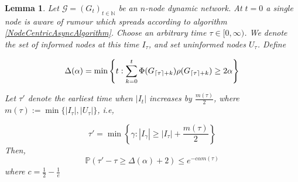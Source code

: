 \documentclass[a4paper,11pt]{article}
\newtheorem{lemma}[theorem]{Lemma}
\theoremstyle{definition}
\DeclarePairedDelimiter\ceil{\lceil}{\rceil}
\begin{document}
\begin{lemma} \label{AsyncIncreaseLemma}
	Let $\mathcal{G}=(G_t)_{t \in \mathbb{N}}$ be an $n$-node dynamic network. At $t=0$ a single node is aware of rumour which spreads according to algorithm \ref{NodeCentricAsyncAlgorithm}. Choose an arbitrary time $\tau \in [0, \infty)$. We denote the set of informed nodes at this time $I_\tau$, and set uninformed nodes $U_\tau$.
	\noindent
	Define 
	
	$$
	\Delta(\alpha) = \min \left\{t: \sum_{k=0}^t \Phi(G_{\ceil{\tau}+k})\rho(G_{\ceil{\tau}+k}) \geq 2 \alpha \right\}
	$$

	\noindent
	Let $\tau'$ denote the earliest time when $|I_t|$ increases by $\frac{m(\tau)}{2}$, where $m(\tau) := \min\{|I_\tau|, |U_\tau|\}$, i.e,

	$$
		\tau' = \min\left\{\gamma : |I_{\gamma}| \geq |I_\tau| + \frac{m(\tau)}{2}\right\}
	$$
	\noindent
	Then, 
	$$
		\mathbb{P}(\tau' - \tau \geq \Delta(\alpha) + 2) \leq e^{-c\alpha m(\tau)}
	$$
	\noindent
	where $c = \frac{1}{2} - \frac{1}{e}$
\end{lemma}

\end{document}
